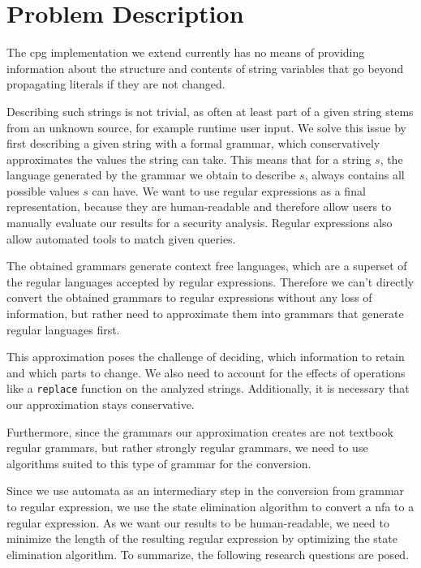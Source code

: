 \chapter{Problem Description}
\label{chapter:ProblemDescription}

The \ac{cpg} implementation we extend currently has no means of providing information about the structure and contents of string variables that go beyond propagating literals if they are not changed.

Describing such strings is not trivial, as often at least part of a given string stems from an unknown source, for example runtime user input.
We solve this issue by first describing a given string with a formal grammar, which conservatively approximates the values the string can take.
This means that for a string $s$, the language generated by the grammar we obtain to describe $s$, always contains all possible values $s$ can have.
We want to use regular expressions as a final representation, because they are human-readable and therefore allow users to manually evaluate our results for a security analysis. Regular expressions also allow automated tools to match given queries. 

The obtained grammars generate context free languages, which are a superset of the regular languages accepted by regular expressions. Therefore we can't directly convert the obtained grammars to regular expressions without any loss of information, but rather need to approximate them into grammars that generate regular languages first.

This approximation poses the challenge of deciding, which information to retain and which parts to change. We also need to account for the effects of operations like a \lstinline|replace| function on the analyzed strings. Additionally, it is necessary that our approximation stays conservative.

Furthermore, since the grammars our approximation creates are not textbook regular grammars, but rather strongly regular grammars, we need to use algorithms suited to this type of grammar for the conversion.

Since we use automata as an intermediary step in the conversion from grammar to regular expression, we use the state elimination algorithm \cite{brzozowksi_mccluskey} to convert a \ac{nfa} to a regular expression. As we want our results to be human-readable, we need to minimize the length of the resulting regular expression by optimizing the state elimination algorithm.
\clearpage
To summarize, the following research questions are posed.


